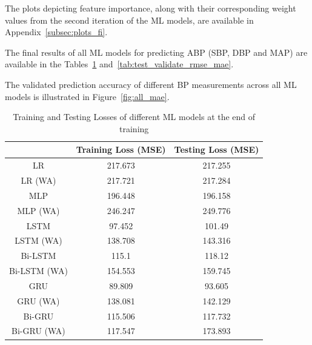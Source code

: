 The plots depicting feature importance, along with their corresponding weight values from the second iteration of the ML models, are available in Appendix~\ref{subsec:plots_fi}.

The final results of all ML models for predicting ABP (SBP, DBP and MAP) are available in the Tables~\ref{tab:train_test_mse} and~\ref{tab:test_validate_rmse_mae}.

The validated prediction accuracy of different BP measurements across all ML models is illustrated in Figure~\ref{fig:all_mae}.

\begin{table}[!]
    \renewcommand{\arraystretch}{1.5}
    \begin{center}
        \vspace{-2cm}
        \footnotesize
        \begin{tabular}{ |c|c|c| }
            \hline
            & Training Loss (MSE)        & Testing Loss (MSE)          \\
            \hline
            LR           & \cellcolor{red!10}217.673  & \cellcolor{red!10}217.255   \\
            \hline
            LR (WA)      & \cellcolor{red!20}217.721  & \cellcolor{red!20}217.284   \\
            \hline
            MLP          & 196.448                    & 196.158                     \\
            \hline
            MLP (WA)     & \cellcolor{red!30}246.247  & \cellcolor{red!30}249.776   \\
            \hline
            LSTM         & \cellcolor{green!20}97.452 & \cellcolor{green!20}101.49  \\
            \hline
            LSTM (WA)    & 138.708                    & 143.316                     \\
            \hline
            Bi-LSTM      & \cellcolor{green!10}115.1  & 118.12                      \\
            \hline
            Bi-LSTM (WA) & 154.553                    & 159.745                     \\
            \hline
            GRU          & \cellcolor{green!30}89.809 & \cellcolor{green!30}93.605  \\
            \hline
            GRU (WA)     & 138.081                    & 142.129                     \\
            \hline
            Bi-GRU       & 115.506                    & \cellcolor{green!10}117.732 \\
            \hline
            Bi-GRU (WA)  & 117.547                    & 173.893                     \\
            \hline
        \end{tabular}
    \end{center}
    \captionsetup{format=plain, justification=centering, font=small}
    \vspace{-0.5cm}
    \caption{Training and Testing Losses of different ML models at the end of training}
    \label{tab:train_test_mse}
\end{table}

